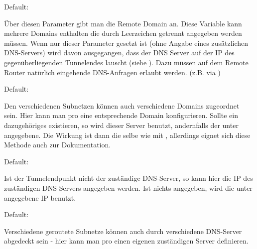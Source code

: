 \begin{description}


  Default: 

  Über diesen Parameter gibt man die Remote Domain an. Diese Variable kann
  mehrere Domains enthalten die durch Leerzeichen getrennt angegeben werden
  müssen. Wenn nur dieser Parameter gesetzt ist (ohne Angabe eines
  zusätzlichen DNS-Servers) wird davon ausgegangen, dass der DNS Server auf der
  IP des gegenüberliegenden Tunnelendes lauscht (siehe ).
  Dazu müssen auf dem Remote Router natürlich eingehende DNS-Anfragen erlaubt werden.
  (z.B. via )


  Default: 

  Den verschiedenen Subnetzen können auch verschiedene Domains zugeordnet sein.
  Hier kann man pro  eine entsprechende Domain konfigurieren.
  Sollte ein dazugehöriges  existieren, so wird dieser Server
  benutzt, andernfalls der unter  angegebene. Die Wirkung ist
  dann die selbe wie mit , allerdings eignet sich diese Methode
  auch zur Dokumentation.


  Default: 

  Ist der Tunnelendpunkt nicht der zuständige DNS-Server, so kann hier die IP
  des zuständigen DNS-Servers angegeben werden.
  Ist nichts angegeben, wird die unter  angegebene IP
  benutzt.


  Default: 

  Verschiedene geroutete Subnetze können auch durch verschiedene DNS-Server
  abgedeckt sein - hier kann man pro  einen eigenen
  zuständigen Server definieren.

\end{description}

